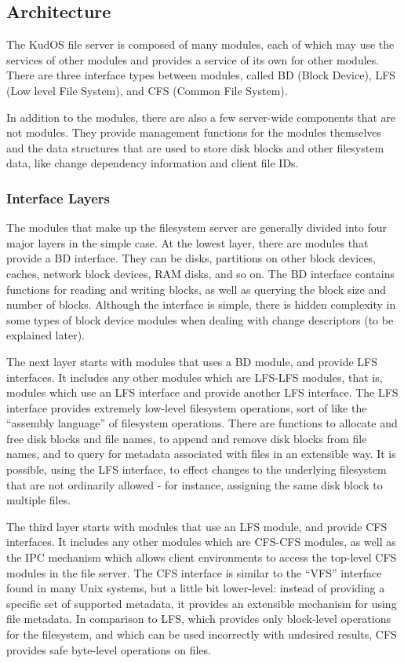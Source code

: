 \subsection{Architecture}
\label{sec:solution:arch}

The KudOS file server is composed of many modules, each of which may use the
services of other modules and provides a service of its own for other modules.
There are three interface types between modules, called BD (Block Device), LFS
(Low level File System), and CFS (Common File System).

In addition to the modules, there are also a few server-wide components that are
not modules. They provide management functions for the modules themselves and
the data structures that are used to store disk blocks and other filesystem
data, like change dependency information and client file IDs.

\subsubsection{Interface Layers}

The modules that make up the filesystem server are generally divided into four
major layers in the simple case. At the lowest layer, there are modules that
provide a BD interface. They can be disks, partitions on other block devices,
caches, network block devices, RAM disks, and so on. The BD interface contains
functions for reading and writing blocks, as well as querying the block size and
number of blocks. Although the interface is simple, there is hidden complexity
in some types of block device modules when dealing with change descriptors (to
be explained later).

The next layer starts with modules that uses a BD module, and provide LFS
interfaces. It includes any other modules which are LFS-LFS modules, that is,
modules which use an LFS interface and provide another LFS interface. The LFS
interface provides extremely low-level filesystem operations, sort of like the
``assembly language'' of filesystem operations. There are functions to allocate
and free disk blocks and file names, to append and remove disk blocks from file
names, and to query for metadata associated with files in an extensible way. It
is possible, using the LFS interface, to effect changes to the underlying
filesystem that are not ordinarily allowed - for instance, assigning the same
disk block to multiple files.

The third layer starts with modules that use an LFS module, and provide CFS
interfaces. It includes any other modules which are CFS-CFS modules, as well as
the IPC mechanism which allows client environments to access the top-level CFS
modules in the file server. The CFS interface is similar to the ``VFS''
interface found in many Unix systems, but a little bit lower-level: instead of
providing a specific set of supported metadata, it provides an extensible
mechanism for using file metadata. In comparison to LFS, which provides only
block-level operations for the filesystem, and which can be used incorrectly
with undesired results, CFS provides safe byte-level operations on files.

